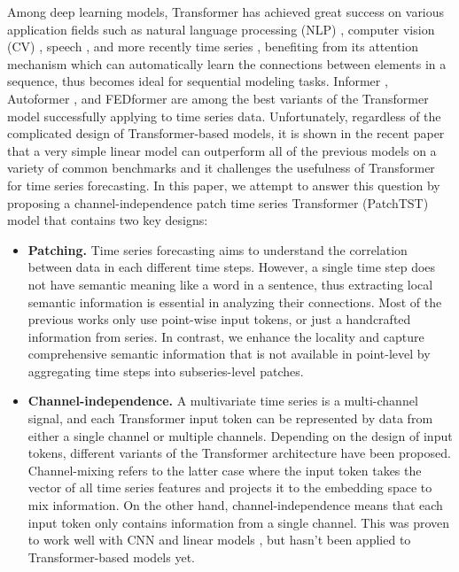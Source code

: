 \documentclass{article} \usepackage{iclr2023_conference,times}
\begin{document}
Among deep learning models, Transformer has achieved great success on various application fields such as natural language processing (NLP) \citep{nlpsurvey}, computer vision (CV) \citep{cvsurvey}, speech \citep{speechsurvey}, and more recently time series \citep{tssurvey}, benefiting from its attention mechanism which can automatically learn the connections between elements in a sequence, thus becomes ideal for sequential modeling tasks. Informer \citep{informer}, Autoformer \citep{autoformer}, and FEDformer \citep{fedformer} are among the best variants of the Transformer model successfully applying to time series data. Unfortunately, regardless of the complicated design of Transformer-based models, it is shown in the recent paper \citep{dlinear} that a very simple linear model can outperform all of the previous models on a variety of common benchmarks and it challenges the usefulness of Transformer for time series forecasting. In this paper, we attempt to answer this question by proposing a channel-independence patch time series Transformer (PatchTST) model that contains two key designs:

\begin{itemize}[leftmargin= 20 pt,itemsep= 5 pt,topsep = 5 pt]
    \item \textbf{Patching.} Time series forecasting aims to understand the correlation between data in each different time steps. However, a single time step does not have semantic meaning like a word in a sentence, thus extracting local semantic information is essential in analyzing their connections. Most of the previous works only use point-wise input tokens, or just a handcrafted information from series. In contrast, we enhance the locality and capture comprehensive semantic information that is not available in point-level by aggregating time steps into subseries-level patches.
    
    \item \textbf{Channel-independence.} A multivariate time series is a multi-channel signal, and each Transformer input token can be represented by data from either a single channel or multiple channels. Depending on the design of input tokens, different variants of the Transformer architecture have been proposed. Channel-mixing refers to the latter case where the input token takes the vector of all time series features and projects it to the embedding space to mix information. On the other hand, channel-independence means that each input token only contains information from a single channel. This was proven to work well with CNN \citep{multichannel} and linear models \citep{dlinear}, but hasn't been applied to Transformer-based models yet.
\end{itemize}
\end{document}
